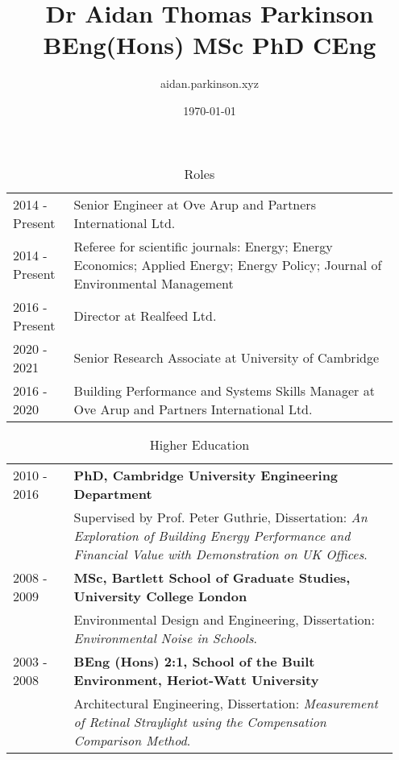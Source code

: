 \documentclass[11pt, oneside]{article}   	%
\title{Dr Aidan Thomas Parkinson BEng(Hons) MSc PhD CEng}
\author{aidan.parkinson.xyz}
\date{\today}							%
\begin{document}
\maketitle

\begin{table}[h]
\caption*{Roles}
\vspace{-5mm}
\small
\begin{center}
\begin{tabular}{p{0.15\linewidth} p{0.8\linewidth}}
\hline
2014 - Present&Senior Engineer at Ove Arup and Partners International Ltd. \\
2014 - Present&Referee for scientific journals: Energy; Energy Economics; Applied Energy; Energy Policy; Journal of Environmental Management \\
2016 - Present&Director at Realfeed Ltd.  \\
2020 - 2021&Senior Research Associate at University of Cambridge  \\
2016 - 2020&Building Performance and Systems Skills Manager at Ove Arup and Partners International Ltd.  \\
\hline
\end{tabular}
\end{center}
\vspace{-10mm}
\end{table}

\begin{table}[h]
\caption*{Higher Education}
\vspace{-5mm}
\small
\begin{center}
\begin{tabular}{p{0.15\linewidth} p{0.8\linewidth}}
\hline
2010 - 2016&\textbf{PhD, Cambridge University Engineering Department} \\
&Supervised by Prof. Peter Guthrie, Dissertation: \emph{An Exploration of Building Energy Performance and Financial Value with Demonstration on UK Offices}. \\
2008 - 2009&\textbf{MSc, Bartlett School of Graduate Studies, University College London} \\
&Environmental Design and Engineering, Dissertation: \emph{Environmental Noise in Schools}. \\
2003 - 2008&\textbf{BEng (Hons) 2:1, School of the Built Environment, Heriot-Watt University} \\
&Architectural Engineering, Dissertation: \emph{Measurement of Retinal Straylight using the Compensation Comparison Method}. \\
\hline
\end{tabular}
\end{center}
\vspace{-10mm}
\end{table}
\end{document}

